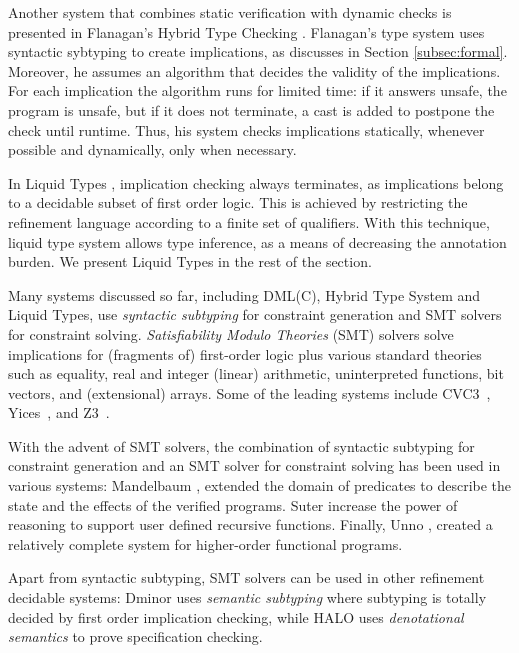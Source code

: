 Another system that combines static verification with dynamic checks is presented in 
Flanagan's Hybrid Type Checking \cite{flanagan06}. 
Flanagan's type system uses syntactic sybtyping to create implications, as discusses in
Section \ref{subsec:formal}. 
Moreover, he assumes an algorithm that decides the validity of the implications.
For each implication the algorithm runs for limited time: 
if it answers unsafe, the program is unsafe, 
but if it does not terminate, a cast is added to postpone the check 
until runtime.
%
Thus, his system
checks implications statically, whenever possible
and dynamically, only when necessary.

In Liquid Types \cite{LiquidPLDI08}, 
implication checking always terminates, 
as implications belong to 
a decidable subset of first order logic.
This is achieved by restricting the refinement language
according to a finite set of qualifiers.
With this technique, liquid type system allows 
type inference, as a means of decreasing the annotation burden.
We present Liquid Types in the rest of the section.

Many systems discussed so far, including DML(C), Hybrid Type System and Liquid Types, 
use \textit{syntactic subtyping} for constraint 
generation and SMT solvers for constraint solving.
\textit{Satisfiability Modulo Theories} (SMT) solvers solve implications 
for (fragments of) first-order logic plus various standard theories such as
equality, real and integer (linear) arithmetic, uninterpreted functions, bit vectors, and (extensional) arrays. 
Some of the leading systems include  CVC3~\cite{CVC3}, Yices~\cite{Yices}, and Z3~\cite{z3}.

With the advent of SMT solvers, 
the combination of syntactic subtyping for constraint generation
and an SMT solver for constraint solving has been used in various systems:
%
Mandelbaum \etal \cite{MandelbaumWalker03},
extended the domain of predicates to describe the state 
and the effects of the verified programs.
%
Suter \etal \cite{SuterKK11} increase the power of reasoning 
to support user defined recursive functions.
Finally, Unno \etal \cite{UnnoTK13},
created a relatively complete system for higher-order functional programs.
 
Apart from syntactic subtyping, SMT solvers can be used in other 
refinement decidable systems:
Dminor \cite{dminor} uses \textit{semantic subtyping} where subtyping is totally 
decided by first order implication checking, while 
HALO \cite{VytiniotisJCR13} uses \textit{denotational semantics}
to prove specification checking.




